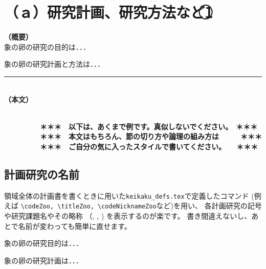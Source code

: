 \documentclass[11pt,a4j,dvipdfmx]{jarticle} 					%
\newcommand{\研究課題名}{象の卵}
\newcommand{\研究機関名}{逢坂大学}
\newcommand{\研究代表者氏名}{湯川秀樹}
\newcommand{\研究期間の最終元号年度}{4}  %
\begin{document}

\section{ （ａ）研究計画、研究方法など\textcircled{1}}

\noindent
\textbf{（概要）}\\
	象の卵の研究の目的は．．．	

	象の卵の研究計画と方法は．．．
	\vspace*{10zw}	%

\noindent
\rule{\linewidth}{1pt}\\
\noindent
\textbf{（本文）}
\JSPSInstructions	%

\textbf{\\　　　　　＊＊＊　以下は、あくまで例です。真似しないでください。　＊＊＊\\
　　　　　＊＊＊　本文はもちろん、節の切り方や論理の組み方は　　　＊＊＊\\
　　　　　＊＊＊　ご自分の気に入ったスタイルで書いてください。　　＊＊＊}

\subsection{計画研究の名前}
        領域全体の計画書を書くときに用いた\texttt{keikaku\_defs.tex}で定義したコマンド
        (例えば
        \texttt{\textbackslash codeZoo, \textbackslash titleZoo, \textbackslash codeNicknameZoo}など)を用い、
        各計画研究の記号や研究課題名やその略称
        （\codeZoo, \titleZoo, \codeNicknameZoo)
        を表示するのが楽です。
       書き間違えないし、あとで名前が変わっても簡単に直せます。

	 象の卵の研究目的は．．．

	象の卵の研究計画は．．．

		
\end{document}
